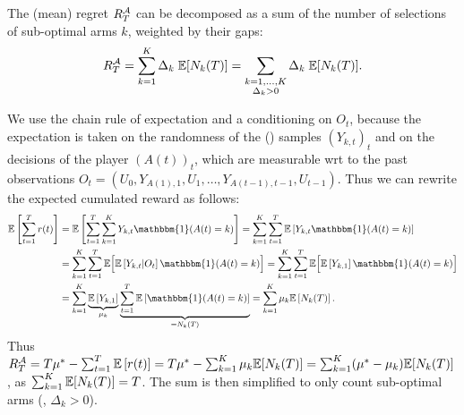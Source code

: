 \begin{proposition}\label{prop:2:RegretDecomposition}
\begin{leftbar}[propositionbar]  %
    The (mean) regret $R_T^{\mathcal{A}}$ can be decomposed as a sum of the number of selections of sub-optimal arms $k$, weighted by their gaps:
    \begin{align}\label{eq:2:RegretDecomposition}
        R_T^{\mathcal{A}} = \sum_{k=1}^K \Delta_k \; \mathbb{E}[ N_k(T) ]
        = \sum_{\substack{k=1,\dots,K\\\Delta_k > 0}} \Delta_k \; \mathbb{E}[ N_k(T) ].
    \end{align}
\end{leftbar}  %
\end{proposition}
%
\begin{smallproof}\label{proof:2:RegretDecomposition}
    We use the chain rule of expectation and a conditioning on $O_t$,
    because the expectation is taken on the randomness of the (\iid) samples $(Y_{k,t})_t$ and on the decisions of the player $(A(t))_t$, which are measurable wrt to the past observations $O_t = (U_0, Y_{A(1),1}, U_1, \dots, Y_{A(t-1),t-1}, U_{t-1})$.
    Thus we can rewrite the expected cumulated reward as follows:
    \begin{align*}
        \E \left[ \sum_{t=1}^T r(t) \right]
        &= \E \left[ \sum_{t=1}^T \sum_{k=1}^K Y_{k,t} \mathbbm{1}(A(t) = k) \right]
        = \sum_{k=1}^K \sum_{t=1}^T \E \left[ Y_{k,t} \mathbbm{1}(A(t) = k) \right] \\
        &= \sum_{k=1}^K \sum_{t=1}^T \E \Bigl[ \E \left[ Y_{k,t} | O_t \right] \mathbbm{1}(A(t) = k) \Bigr]
        = \sum_{k=1}^K \sum_{t=1}^T \E \Bigl[ \E \left[ Y_{k,1} \right] \mathbbm{1}(A(t) = k) \Bigr] \\
        &= \sum_{k=1}^K \underbrace{\E \left[ Y_{k,1} \right]}_{\mu_k} \underbrace{\sum_{t=1}^T \E \left[ \mathbbm{1}(A(t) = k) \right]}_{= N_k(T)}
        = \sum_{k=1}^K \mu_k \E \left[ N_k(T) \right].
    \end{align*}
    Thus $R_T^{\mathcal{A}} = T \mu^* - \sum_{t=1}^T \mathbb{E}\left[ r(t) \right] = T \mu^* - \sum_{k=1}^K \mu_k \mathbb{E}[ N_k(T) ] = \sum_{k=1}^K (\mu^* - \mu_k) \mathbb{E}[ N_k(T) ]$,
    as $\sum_{k=1}^K  \mathbb{E}[ N_k(T) ] = T$.
    The sum is then simplified to only count sub-optimal arms (\ie, $\Delta_k > 0$).
\end{smallproof}


